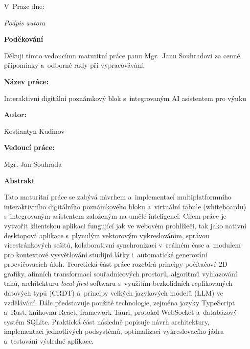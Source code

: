\documentclass[12pt, a4paper, oneside]{article}
\newcommand{\NazevPrace}{Interaktivní digitální poznámkový blok s~integrovaným AI asistentem pro výuku}
\newcommand{\Autor}{Kostiantyn Kudinov}
\newcommand{\Vedouci}{Mgr. Jan Souhrada}
\newcommand{\nadpismimoobsah}[1]{%
    \vspace{6pt}%
    {\normalfont\fontsize{14pt}{18pt}\selectfont\sffamily\bfseries #1\par}%
    \vspace{2pt}%
}
\begin{document}
\vspace{1.2cm}
V~Praze dne: 

\vspace{1.8cm}
\textit{Podpis autora}

\clearpage

\vspace*{6.5cm}

\nadpismimoobsah{Poděkování}

Děkuji tímto vedoucímu maturitní práce panu Mgr.~Janu Souhradovi za cenné připomínky a~odborné rady při vypracovávání.

\clearpage

\pagestyle{fancy}
\setcounter{page}{5}

\nadpismimoobsah{Název práce:}
\NazevPrace

\nadpismimoobsah{Autor:}
\Autor

\nadpismimoobsah{Vedoucí práce:}
\Vedouci

\nadpismimoobsah{Abstrakt}
Tato maturitní práce se zabývá návrhem a~implementací multiplatformního interaktivního digitálního poznámkového bloku a~virtuální tabule (whiteboardu) s~integrovaným asistentem založeným na umělé inteligenci. Cílem práce je vytvořit klientskou aplikaci fungující jak ve webovém prohlížeči, tak jako nativní desktopová aplikace s~plynulým vektorovým vykreslováním, správou vícestránkových sešitů, kolaborativní synchronizací v~reálném čase a~modulem pro kontextové vysvětlování studijní látky i~automatické generování procvičovacích úloh. Teoretická část práce rozebírá principy počítačové 2D grafiky, afinních transformací souřadnicových prostorů, algoritmů vyhlazování tahů, architekturu \textit{local-first} softwaru s~využitím bezkolidních replikovaných datových typů (CRDT) a~principy velkých jazykových modelů (LLM) ve vzdělávání. Dále představuje použité technologie, zejména jazyky TypeScript a~Rust, knihovnu React, framework Tauri, protokol WebSocket a~databázový systém SQLite. Praktická část následně popisuje návrh architektury, implementaci jednotlivých podsystémů, optimalizaci vykreslovacího jádra a~testování výsledné aplikace.
\end{document}
